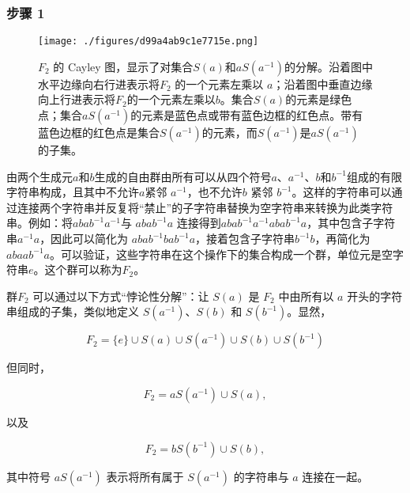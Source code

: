 \subsubsection{步骤 1}
\begin{figure}[ht]
\centering
\texttt{[image: ./figures/d99a4ab9c1e7715e.png]}
\caption{\( F_2 \) 的 Cayley 图，显示了对集合\( S(a) \)和\( aS(a^{-1}) \)的分解。沿着图中水平边缘向右行进表示将\( F_2 \) 的一个元素左乘以 \( a \)；沿着图中垂直边缘向上行进表示将\( F_2 \)的一个元素左乘以\( b \)。集合\( S(a) \)的元素是绿色点；集合\( aS(a^{-1}) \)的元素是蓝色点或带有蓝色边框的红色点。带有蓝色边框的红色点是集合\( S(a^{-1}) \)的元素，而\( S(a^{-1}) \)是\( aS(a^{-1}) \) 的子集。} \label{fig_BTS_2}
\end{figure}
由两个生成元\( a \)和\( b \)生成的自由群由所有可以从四个符号\( a \)、\( a^{-1} \)、\( b \)和\( b^{-1} \)组成的有限字符串构成，且其中不允许\( a \)紧邻 \( a^{-1} \)，也不允许\( b \) 紧邻 \( b^{-1} \)。这样的字符串可以通过连接两个字符串并反复将“禁止”的子字符串替换为空字符串来转换为此类字符串。例如：将\( abab^{-1}a^{-1} \)与 \( abab^{-1}a \) 连接得到\( abab^{-1}a^{-1}abab^{-1}a \)，其中包含子字符串\( a^{-1}a \)，因此可以简化为 \( abab^{-1}bab^{-1}a \)，接着包含子字符串\( b^{-1}b \)，再简化为\( abaab^{-1}a \)。可以验证，这些字符串在这个操作下的集合构成一个群，单位元是空字符串\( e \)。这个群可以称为\( F_2 \)。

群\( F_2 \) 可以通过以下方式“悖论性分解”：让 \( S(a) \) 是 \( F_2 \) 中由所有以 \( a \) 开头的字符串组成的子集，类似地定义 \( S(a^{-1}) \)、\( S(b) \) 和 \( S(b^{-1}) \)。显然，

\[
F_2 = \{ e \} \cup S(a) \cup S(a^{-1}) \cup S(b) \cup S(b^{-1})
\]

但同时，

\[
F_2 = aS(a^{-1}) \cup S(a),
\]

以及

\[
F_2 = bS(b^{-1}) \cup S(b),
\]

其中符号 \( aS(a^{-1}) \) 表示将所有属于 \( S(a^{-1}) \) 的字符串与 \( a \) 连接在一起。